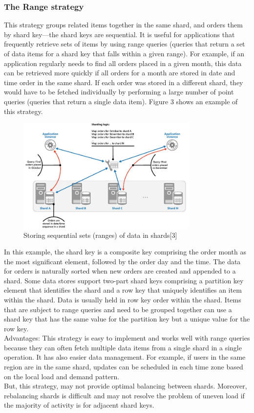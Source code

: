 \documentclass[10pt, conference]{IEEEtran}
\begin{document}
\subsubsection{The Range strategy}
\indent This strategy groups related items together in the same shard, and orders them by shard key—the shard keys are sequential. It is useful for applications that frequently retrieve sets of items by using range queries (queries that return a set of data items for a shard key that falls within a given range). For example, if an application regularly needs to find all orders placed in a given month, this data can be retrieved more quickly if all orders for a month are stored in date and time order in the same shard. If each order was stored in a different shard, they would have to be fetched individually by performing a large number of point queries (queries that return a single data item). Figure 3 shows an example of this strategy.\\
\begin{figure}[h!]
	\centering
	\includegraphics[width=9cm]{figure3.jpg}
	\caption{Storing sequential sets (ranges) of data in shards[3]}
\end{figure} 
\indent In this example, the shard key is a composite key comprising the order month as the most significant element, followed by the order day and the time. The data for orders is naturally sorted when new orders are created and appended to a shard. Some data stores support two-part shard keys comprising a partition key element that identifies the shard and a row key that uniquely identifies an item within the shard. Data is usually held in row key order within the shard. Items that are subject to range queries and need to be grouped together can use a shard key that has the same value for the partition key but a unique value for the row key.\\
\indent Advantages: This strategy is easy to implement and works well with range queries because they can often fetch multiple data items from a single shard in a single operation. It has also easier data management. For example, if users in the same region are in the same shard, updates can be scheduled in each time zone based on the local load and demand pattern.\\
\indent But, this strategy, may not provide optimal balancing between shards. Moreover, rebalancing shards is difficult and may not resolve the problem of uneven load if the majority of activity is for adjacent shard keys. 
\end{document}
